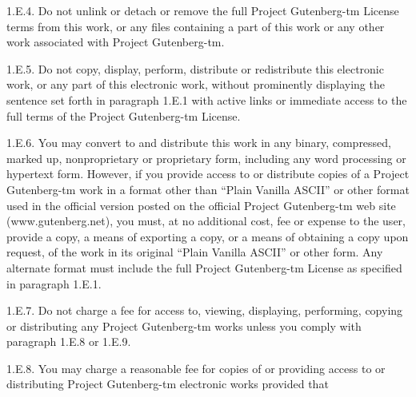 \documentclass[12pt,oneside]{scrbook}
\begin{document}
  1.E.4. Do not unlink or detach or remove the full Project Gutenberg-tm
  License terms from this work, or any files containing a part of this
  work or any other work associated with Project Gutenberg-tm.
  
  1.E.5. Do not copy, display, perform, distribute or redistribute this
  electronic work, or any part of this electronic work, without
  prominently displaying the sentence set forth in paragraph 1.E.1 with
  active links or immediate access to the full terms of the Project
  Gutenberg-tm License.
  
  1.E.6. You may convert to and distribute this work in any binary,
  compressed, marked up, nonproprietary or proprietary form, including any
  word processing or hypertext form. However, if you provide access to or
  distribute copies of a Project Gutenberg-tm work in a format other than
  ``Plain Vanilla ASCII'' or other format used in the official version
  posted on the official Project Gutenberg-tm web site
  (www.gutenberg.net), you must, at no additional cost, fee or expense to
  the user, provide a copy, a means of exporting a copy, or a means of
  obtaining a copy upon request, of the work in its original ``Plain
  Vanilla ASCII'' or other form. Any alternate format must include the
  full Project Gutenberg-tm License as specified in paragraph 1.E.1.
  
  1.E.7. Do not charge a fee for access to, viewing, displaying,
  performing, copying or distributing any Project Gutenberg-tm works
  unless you comply with paragraph 1.E.8 or 1.E.9.
  
  1.E.8. You may charge a reasonable fee for copies of or providing access
  to or distributing Project Gutenberg-tm electronic works provided that
  
\end{document}
